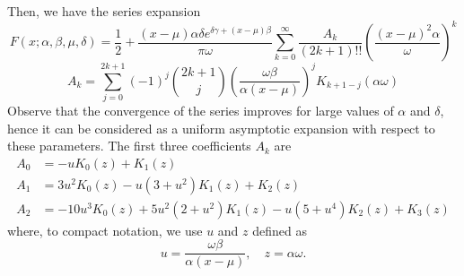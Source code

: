 \documentclass[10pt,a4paper,oneside]{article}
\numberwithin{equation}{section}
\begin{document}
Then, we have the series expansion
\begin{equation}\label{general_expansion_xmu_small_bessel}
F(x;\alpha, \beta, \mu, \delta) = \frac{1}{2} + \frac{(x-\mu)\alpha\delta e^{\delta \gamma + (x -\mu)\beta}}{\pi \omega}\sum_{k=0}^{\infty} \frac{A_k}{(2k+1)!!}\left(\frac{(x-\mu)^2\alpha}{\omega}\right)^k
\end{equation}
\begin{equation}
A_k = \sum_{j=0}^{2k+1} (-1)^j \binom{2k+1}{j} \left(\frac{\omega \beta}{\alpha (x-\mu)}\right)^j K_{k + 1 - j}(\alpha \omega)
\end{equation}
Observe that the convergence of the series improves for large values of $\alpha$ and $\delta$, hence it can be considered as a uniform asymptotic expansion with respect to these parameters. The first three coefficients $A_k$ are
\begin{align*}
A_0 &= -u K_0(z) + K_1(z)\\
A_1 &= 3u^2 K_0(z) - u(3 + u^2) K_1(z) + K_2(z)\\
A_2 &= -10u^3 K_0(z) + 5u^2(2 + u^2) K_1(z) - u(5 + u^4) K_2(z) + K_3(z)
\end{align*}
where, to compact notation, we use $u$ and $z$ defined as
\begin{equation}
u = \frac{\omega \beta}{\alpha (x-\mu)}, \quad z = \alpha \omega.
\end{equation}
\end{document}

